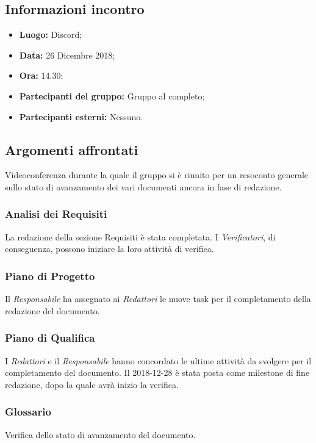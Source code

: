 \subsection{Informazioni incontro}
\begin{itemize}
	\item { \textbf{Luogo:} Discord;  }
	\item { \textbf{Data:} 26 Dicembre 2018; }
	\item { \textbf{Ora:} 14.30; }
	\item { \textbf{Partecipanti del gruppo:} Gruppo al completo; }
	\item { \textbf{Partecipanti esterni:} Nessuno. }
\end{itemize}


\subsection{Argomenti affrontati}
Videoconferenza durante la quale il gruppo si è riunito per un resoconto generale sullo stato di avanzamento dei vari documenti ancora in fase di redazione.

\subsubsection{Analisi dei Requisiti}
La redazione della sezione Requisiti è stata completata. I \emph{Verificatori}, di conseguenza, possono iniziare la loro attività di verifica.  

\subsubsection{Piano di Progetto}
Il \emph{Responsabile} ha assegnato ai \emph{Redattori} le nuove task per il completamento della redazione del documento.

\subsubsection{Piano di Qualifica}
I \emph{Redattori} e il \emph{Responsabile} hanno concordato le ultime attività da svolgere per il completamento del documento. Il 2018-12-28 è stata posta come milestone di fine redazione, dopo la quale avrà inizio la verifica.

\subsubsection{Glossario}
Verifica dello stato di avanzamento del documento.

